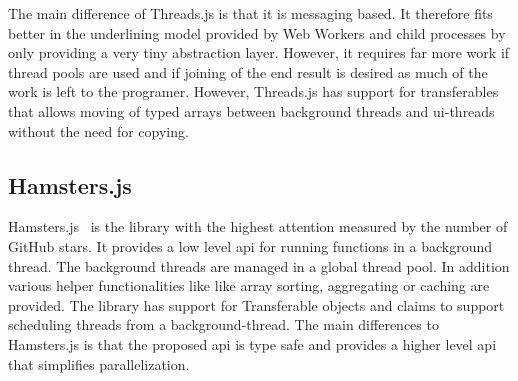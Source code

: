 The main difference of Threads.js is that it is messaging based. It therefore fits better in the underlining model provided by Web Workers and child processes by only providing a very tiny abstraction layer. However, it requires far more work if thread pools are used and if joining of the end result is desired as much of the work is left to the programer. However, Threads.js has support for transferables~\cite[Section 2.7.4]{w3cHtml5} that allows moving of typed arrays between background threads and ui-threads without the need for copying. 


\subsection{Hamsters.js}
Hamsters.js~\cite{hamstersjs} is the library with the highest attention measured by the number of GitHub stars. It provides a low level api for running functions in a background thread. The background threads are managed in a global thread pool. In addition various helper functionalities like like array sorting, aggregating or caching are provided. The library has support for Transferable objects and claims to support scheduling threads from a background-thread. The main differences to Hamsters.js is that the proposed api is type safe and provides a higher level api that simplifies parallelization. 